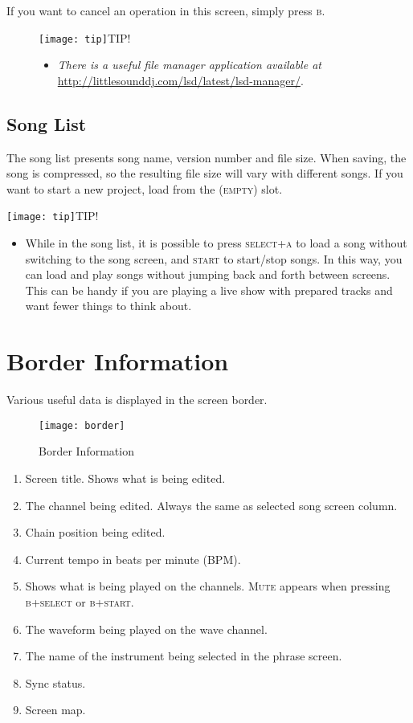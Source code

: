 If you want to cancel an operation in this screen, simply press \textsc{b}.

\begin{figure}[hbtp]
\texttt{[image: tip]}TIP!
\begin{itemize}
        \item \textit{There is a useful file manager application available at} \url{http://littlesounddj.com/lsd/latest/lsd-manager/}.
	\end{itemize}
\end{figure}

\subsection{Song List}

The song list presents song name, version number and file size. When saving, the song is compressed, so the resulting file size will vary with different songs. If you want to start a new project, load from the \textsc{(empty)} slot.

\texttt{[image: tip]}TIP!
\begin{itemize}
    \item{While in the song list, it is possible to press \textsc{select+a} to load a song without switching to the song screen, and \textsc{start} to start/stop songs. In this way, you can load and play songs without jumping back and forth between screens. This can be handy if you are playing a live show with prepared tracks and want fewer things to think about.}
\end{itemize}

\section{Border Information}

Various useful data is displayed in the screen border.

\begin{figure}[htpb]
	\begin{center}
	\texttt{[image: border]}
	\end{center}
	\caption{Border Information}
	\label{fig:border}
\end{figure}

\begin{enumerate}
\item Screen title. Shows what is being edited.
\item The channel being edited. Always the same as selected song screen column.
\item Chain position being edited.
\item Current tempo in beats per minute (BPM).
\item Shows what is being played on the channels. \textsc{Mute} appears when pressing \textsc{b+select} or \textsc{b+start}.
\item The waveform being played on the wave channel.
\item The name of the instrument being selected in the phrase screen.
\item Sync status.
\item Screen map.
\end{enumerate}


